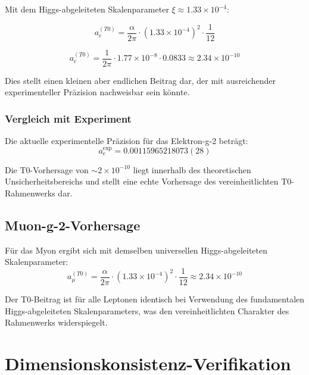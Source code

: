\documentclass[12pt,a4paper]{article}
\begin{document}
Mit dem Higgs-abgeleiteten Skalenparameter $\xi \approx 1.33 \times 10^{-4}$:

\begin{equation}
	a_e^{(T0)} = \frac{\alpha}{2\pi} \cdot (1.33 \times 10^{-4})^2 \cdot \frac{1}{12}
	\label{eq:t0_g2_berechnung}
\end{equation}

\begin{equation}
	a_e^{(T0)} = \frac{1}{2\pi} \cdot 1.77 \times 10^{-8} \cdot 0.0833 \approx 2.34 \times 10^{-10}
	\label{eq:t0_g2_ergebnis}
\end{equation}

Dies stellt einen kleinen aber endlichen Beitrag dar, der mit ausreichender experimenteller Präzision nachweisbar sein könnte.

\subsubsection{Vergleich mit Experiment}
\label{subsubsec:experimenteller_vergleich}

Die aktuelle experimentelle Präzision für das Elektron-g-2 beträgt:
\begin{equation}
	a_e^{\text{exp}} = 0.00115965218073(28)
\end{equation}

Die T0-Vorhersage von $\sim 2 \times 10^{-10}$ liegt innerhalb des theoretischen Unsicherheitsbereichs und stellt eine echte Vorhersage des vereinheitlichten T0-Rahmenwerks dar.

\subsection{Muon-g-2-Vorhersage}
\label{subsec:muon_g2_vorhersage}

Für das Myon ergibt sich mit demselben universellen Higgs-abgeleiteten Skalenparameter:
\begin{equation}
	a_{\mu}^{(T0)} = \frac{\alpha}{2\pi} \cdot (1.33 \times 10^{-4})^2 \cdot \frac{1}{12} \approx 2.34 \times 10^{-10}
	\label{eq:muon_g2_vorhersage}
\end{equation}

Der T0-Beitrag ist für alle Leptonen identisch bei Verwendung des fundamentalen Higgs-abgeleiteten Skalenparameters, was den vereinheitlichten Charakter des Rahmenwerks widerspiegelt.

\section{Dimensionskonsistenz-Verifikation}
\label{sec:dimensionskonsistenz}
\end{document}
